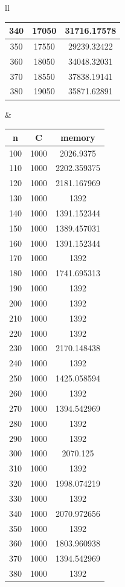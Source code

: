 \documentclass{article}
\begin{document}
\begin{center}
\begin{tabular}{ll}
\begin{tabular}{|c|c|c|}
340	&	17050	&	31716.17578	\\	\hline
350	&	17550	&	29239.32422	\\	\hline
360	&	18050	&	34048.32031	\\	\hline
370	&	18550	&	37838.19141	\\	\hline
380	&	19050	&	35871.62891	\\	\hline
\end{tabular}
&
\begin{tabular}{|c|c|c|}
\hline
n	&	C	&	memory	\\	\hline
100	&	1000	&	2026.9375	\\	\hline
110	&	1000	&	2202.359375	\\	\hline
120	&	1000	&	2181.167969	\\	\hline
130	&	1000	&	1392	\\	\hline
140	&	1000	&	1391.152344	\\	\hline
150	&	1000	&	1389.457031	\\	\hline
160	&	1000	&	1391.152344	\\	\hline
170	&	1000	&	1392	\\	\hline
180	&	1000	&	1741.695313	\\	\hline
190	&	1000	&	1392	\\	\hline
200	&	1000	&	1392	\\	\hline
210	&	1000	&	1392	\\	\hline
220	&	1000	&	1392	\\	\hline
230	&	1000	&	2170.148438	\\	\hline
240	&	1000	&	1392	\\	\hline
250	&	1000	&	1425.058594	\\	\hline
260	&	1000	&	1392	\\	\hline
270	&	1000	&	1394.542969	\\	\hline
280	&	1000	&	1392	\\	\hline
290	&	1000	&	1392	\\	\hline
300	&	1000	&	2070.125	\\	\hline
310	&	1000	&	1392	\\	\hline
320	&	1000	&	1998.074219	\\	\hline
330	&	1000	&	1392	\\	\hline
340	&	1000	&	2070.972656	\\	\hline
350	&	1000	&	1392	\\	\hline
360	&	1000	&	1803.960938	\\	\hline
370	&	1000	&	1394.542969	\\	\hline
380	&	1000	&	1392	\\	\hline
\end{tabular}
    \end{tabular}
\end{center}
\end{document}
